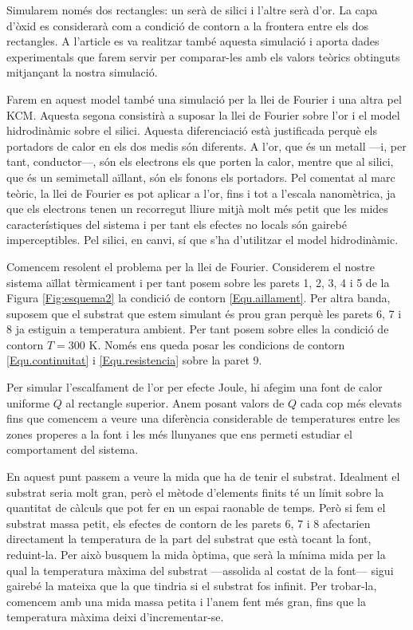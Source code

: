\documentclass{article}
\begin{document}
Simularem nom\'{e}s dos rectangles: un ser\`{a} de silici i l'altre ser\`{a} d'or. La capa d'\`{o}xid es considerar\`{a} com a condici\'{o} de contorn a la frontera entre els dos rectangles. A l'article  \cite{torres2018emergence} es va realitzar tamb\'{e} aquesta simulaci\'{o} i aporta dades experimentals que farem servir per comparar-les amb els valors te\`{o}rics obtinguts mitjan\c{c}ant la nostra simulaci\'{o}.

Farem en aquest model tamb\'{e} una simulaci\'{o} per la llei de Fourier i una altra pel KCM. Aquesta segona consistir\`{a} a suposar la llei de Fourier sobre l'or i el model hidrodin\`{a}mic sobre el silici. Aquesta diferenciaci\'{o} est\`{a} justificada perqu\`{e} els portadors de calor en els dos medis s\'{o}n diferents. A l'or, que \'{e}s un metall ---i, per tant, conductor---, s\'{o}n els electrons els que porten la calor, mentre que al silici, que \'{e}s un semimetall a\"{i}llant, s\'{o}n els fonons els portadors. Pel comentat al marc te\`{o}ric, la llei de Fourier es pot aplicar a l'or, fins i tot a l'escala nanom\`{e}trica, ja que els electrons tenen un recorregut lliure mitj\`{a} molt m\'{e}s petit que les mides caracter\'{i}stiques del sistema i per tant els efectes no locals s\'{o}n gaireb\'{e} imperceptibles. Pel silici, en canvi, s\'{i} que s'ha d'utilitzar el model hidrodin\`{a}mic.

Comencem resolent el problema per la llei de Fourier. Considerem el nostre sistema a\"{i}llat t\`{e}rmicament i per tant posem sobre les parets 1, 2, 3, 4 i 5 de la Figura \ref{Fig:esquema2} la condici\'{o} de contorn \eqref{Equ.aillament}. Per altra banda, suposem que el substrat que estem simulant \'{e}s prou gran perqu\`{e} les parets 6, 7 i 8 ja estiguin a temperatura ambient. Per tant posem sobre elles la condici\'{o} de contorn $T=300$ K. Nom\'{e}s ens queda posar les condicions de contorn \eqref{Equ.continuitat} i \eqref{Equ.resistencia} sobre la paret 9.

Per simular l'escalfament de l'or per efecte Joule, hi afegim una font de calor uniforme $Q$ al rectangle superior. Anem posant valors de $Q$ cada cop m\'{e}s elevats fins que comencem a veure una difer\`{e}ncia considerable de temperatures entre les zones properes a la font i les m\'{e}s llunyanes que ens permeti estudiar el comportament del sistema.

En aquest punt passem a veure la mida que ha de tenir el substrat. Idealment el substrat seria molt gran, per\`{o} el m\`{e}tode d'elements finits t\'{e} un l\'{i}mit sobre la quantitat de c\`{a}lculs que pot fer en un espai raonable de temps. Per\`{o} si fem el substrat massa petit, els efectes de contorn de les parets 6, 7 i 8 afectarien directament la temperatura de la part del substrat que est\`{a} tocant la font, reduint-la. Per aix\`{o} busquem la mida \`{o}ptima, que ser\`{a} la m\'{i}nima mida per la qual la temperatura m\`{a}xima del substrat ---assolida al costat de la font--- sigui gaireb\'{e} la mateixa que la que tindria si el substrat fos infinit. Per trobar-la, comencem amb una mida massa petita i l'anem fent m\'{e}s gran, fins que la temperatura m\`{a}xima deixi d'incrementar-se.
\end{document}

